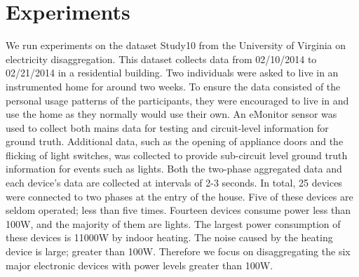 \section{Experiments}
We run experiments on the dataset Study10 from the University of Virginia on electricity disaggregation. 
This dataset collects data from 02/10/2014 to 02/21/2014 in a residential building. 
Two individuals were asked to live in an instrumented home for around two weeks. 
To ensure the data consisted of the personal usage patterns of the participants, 
they were encouraged to live in and use the home as they normally would use their own. 
An eMonitor \cite{eMonitor} sensor was used to collect both mains data for testing and circuit-level information for ground truth. 
Additional data, such as the opening of appliance doors and the flicking of light switches, 
was collected to provide sub-circuit level ground truth information for events such as lights.
Both the two-phase aggregated data and each device's data are collected at intervals of 2-3 seconds.
In total, 25 devices were connected to two phases at the entry of the house. 
Five of these devices are seldom operated; less than five times. 
Fourteen devices consume power less than 100W, and the majority of them are lights. 
The largest power consumption of these devices is 11000W by indoor heating. 
The noise caused by the heating device is large; greater than 100W. 
Therefore we focus on disaggregating the six major electronic devices 
with power levels greater than 100W. 
 
%

